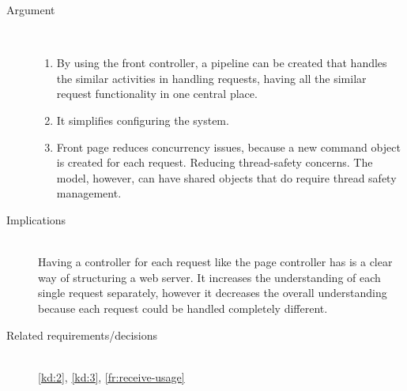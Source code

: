 \begin{description}
\item [Argument]~
\begin{enumerate}
\item By using the front controller, a pipeline can be created that handles the similar activities in handling requests, having all the similar request functionality in one central place.
\item It simplifies configuring the system.
\item Front page reduces concurrency issues, because a new command object is created for each request. Reducing thread-safety concerns. The model, however, can have shared objects that do require thread safety management.
\end{enumerate}

\item [Implications]~\\
Having a controller for each request like the page controller has is a clear way of structuring a web server. It increases the understanding of each single request separately, however it decreases the overall understanding because each request could be handled completely different.

\item [Related requirements/decisions]~\\
\ref{kd:2}, \ref{kd:3}, \ref{fr:receive-usage}

\end{description}

%
